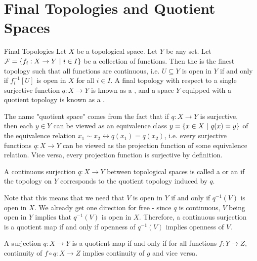 \section{Final Topologies and Quotient Spaces}
\begin{importantdefinition}{Final Topologies}{}
	Let $X$ be a topological space. Let $Y$ be any set. Let $\mathcal{F} = \qty{f_i : X \to Y ~\middle|~i \in I}$ be a collection of functions. Then the  is the finest topology such that all functions are continuous, i.e. $U \subseteq Y$ is open in $Y$ if and only if $f_i^{-1}[U]$ is open in $X$ for all $i \in I$.
	\newpar
	A final topology with respect to a single surjective function $q : X \to Y$ is known as a , and a space $Y$ equipped with a quotient topology is known as a .
\end{importantdefinition}
The name "quotient space" comes from the fact that if $q : X \to Y$ is surjective, then each $y \in Y$ can be viewed as an equivalence class $y = \qty{x \in X ~\middle|~q(x) = y}$ of the equivalence relation $x_1 \sim x_2 \leftrightarrow q(x_1) = q(x_2)$, i.e. every surjective functions $q : X \to Y$ can be viewed as the projection function of some equivalence relation. Vice versa, every projection function is surjective by definition.
\begin{definition}
	A continuous surjection $q : X \to Y$ between topological spaces is called a  or an  if the topology on $Y$ corresponds to the quotient topology induced by $q$.
\end{definition}
Note that this means that we need that $V$ is open in $Y$ if and only if $q^{-1}(V)$ is open in $X$. We already get one direction for free - since $q$ is continuous, $V$ being open in $Y$ implies that $q^{-1}(V)$ is open in $X$. Therefore, a continuous surjection is a quotient map if and only if openness of $q^{-1}(V)$ implies openness of $V$.
\begin{theorem}
	A surjection $q : X \to Y$ is a quotient map if and only if for all functions $f : Y \to Z$, continuity of $f \circ q : X \to Z$ implies continuity of $g$ and vice versa.
\end{theorem}
